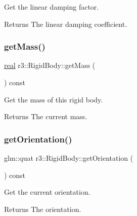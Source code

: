 Get the linear damping factor. 

\begin{DoxyReturn}{Returns}
The linear damping coefficient. 
\end{DoxyReturn}
\mbox{\label{classr3_1_1_rigid_body_a171ee8190ba1c7c2a40c5faf8d654170}} 
\subsubsection{\texorpdfstring{get\+Mass()}{getMass()}}
{\footnotesize\ttfamily \mbox{\hyperlink{namespacer3_ab2016b3e3f743fb735afce242f0dc1eb}{real}} r3\+::\+Rigid\+Body\+::get\+Mass (\begin{DoxyParamCaption}{ }\end{DoxyParamCaption}) const}



Get the mass of this rigid body. 

\begin{DoxyReturn}{Returns}
The current mass. 
\end{DoxyReturn}
\mbox{\label{classr3_1_1_rigid_body_ae12d1d4d9dbbb970ed83fa1eab2d928a}} 
\subsubsection{\texorpdfstring{get\+Orientation()}{getOrientation()}}
{\footnotesize\ttfamily glm\+::quat r3\+::\+Rigid\+Body\+::get\+Orientation (\begin{DoxyParamCaption}{ }\end{DoxyParamCaption}) const}



Get the current orientation. 

\begin{DoxyReturn}{Returns}
The orientation. 
\end{DoxyReturn}
\mbox{\label{classr3_1_1_rigid_body_ab73b4319a248ebf6557851afa5050481}} 
